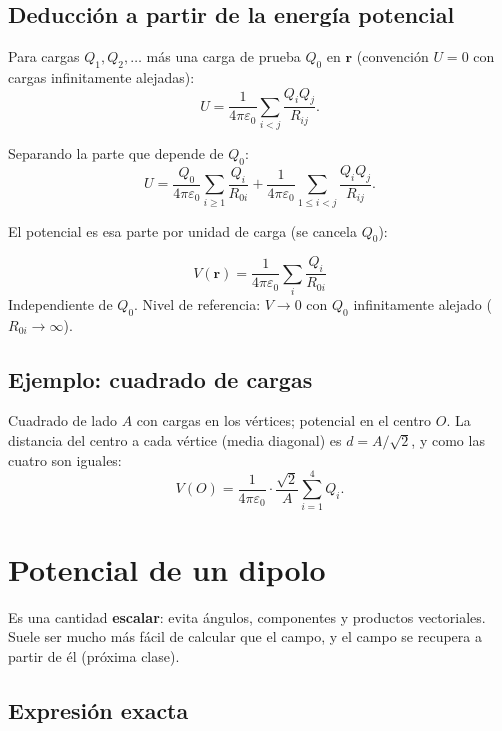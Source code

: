 \documentclass[12pt,a4paper]{article}
\begin{document}
\subsection{Deducción a partir de la energía potencial}

Para cargas $Q_1,Q_2,\dots$ más una carga de prueba $Q_0$ en $\mathbf{r}$
(convención $U=0$ con cargas infinitamente alejadas):
\[
U = \frac{1}{4\pi\varepsilon_0}\sum_{i<j}\frac{Q_i Q_j}{R_{ij}}.
\]

Separando la parte que depende de $Q_0$:
\[
U = \frac{Q_0}{4\pi\varepsilon_0}\sum_{i\geq 1}\frac{Q_i}{R_{0i}}
  + \frac{1}{4\pi\varepsilon_0}\sum_{1\leq i<j}\frac{Q_i Q_j}{R_{ij}}.
\]

El potencial es esa parte por unidad de carga (se cancela $Q_0$):

\begin{keybox}
  \[
  \boxed{V(\mathbf{r}) = \frac{1}{4\pi\varepsilon_0}\sum_{i}\frac{Q_i}{R_{0i}}}
  \]
  Independiente de $Q_0$. Nivel de referencia: $V\to 0$ con $Q_0$
  infinitamente alejado ($R_{0i}\to\infty$).
\end{keybox}

\subsection{Ejemplo: cuadrado de cargas}

Cuadrado de lado $A$ con cargas en los vértices; potencial en el centro
$O$. La distancia del centro a cada vértice (media diagonal) es
$d = A/\sqrt{2}$, y como las cuatro son iguales:
\[
V(O) = \frac{1}{4\pi\varepsilon_0}\cdot\frac{\sqrt{2}}{A}\sum_{i=1}^{4} Q_i.
\]

\section{Potencial de un dipolo}

\begin{notebox}
  Es una cantidad \textbf{escalar}: evita ángulos, componentes y
  productos vectoriales. Suele ser mucho más fácil de calcular que el
  campo, y el campo se recupera a partir de él (próxima clase).
\end{notebox}

\subsection{Expresión exacta}
\end{document}
